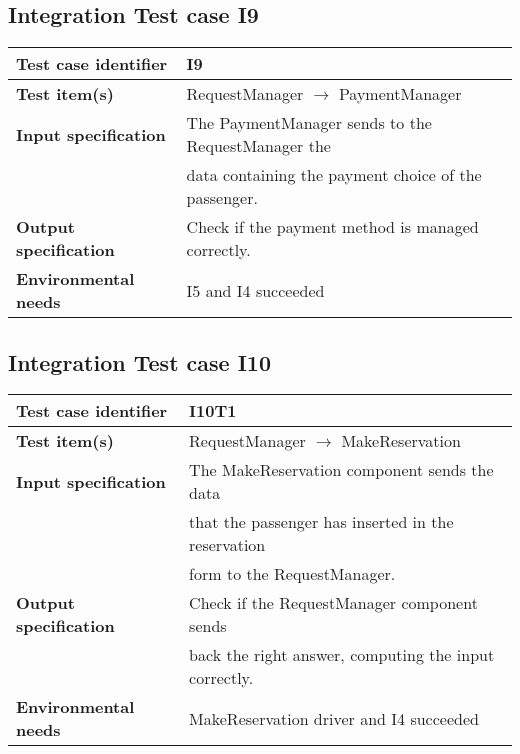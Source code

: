 	\subsection{Integration Test case I9}
		\begin{adjustbox}{max width=\textwidth}
			\begin{tabular}{ l l}
				\hline 		\textbf{Test case identifier} & I9 \\
				\hline		\textbf{Test item(s)}  & RequestManager $\rightarrow$ PaymentManager \\
				\hline		\textbf{Input specification} & The PaymentManager sends to the RequestManager the\\ & data containing the payment choice of the passenger.\\
				\hline		\textbf{Output specification} & Check if the payment method is managed correctly.\\
				\hline		\textbf{Environmental needs} & I5 and I4 succeeded\\
				\hline
			\end{tabular}
		\end{adjustbox}
		
	\hypertarget{chapter 3.10}{ }
	\subsection{Integration Test case I10}
		\begin{adjustbox}{max width=\textwidth}
			\begin{tabular}{ l l}
				\hline 		\textbf{Test case identifier} & I10T1 \\
				\hline		\textbf{Test item(s)}  & RequestManager $\rightarrow$ MakeReservation \\
				\hline		\textbf{Input specification} & The MakeReservation component sends the data\\& that the passenger has inserted in the reservation\\&  form to the RequestManager.\\
				\hline		\textbf{Output specification} & Check if the RequestManager component sends \\& back the right answer, computing the input correctly.\\
				\hline		\textbf{Environmental needs} & MakeReservation driver and I4 succeeded\\
				\hline
			\end{tabular}
		\end{adjustbox}
		
